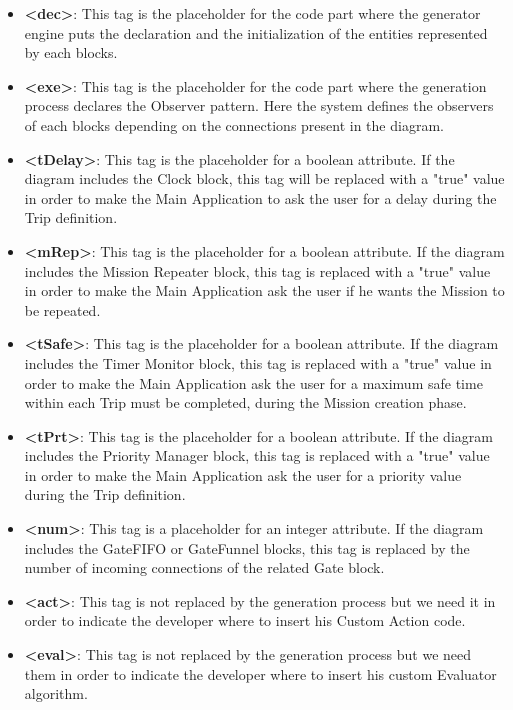 \begin{itemize}
\item{\textbf{<dec>}: This tag is the placeholder for the code part where the generator engine puts the declaration and the initialization of the entities represented by each blocks.
}
\item{\textbf{<exe>}: This tag is the placeholder for the code part where the generation process declares the Observer pattern. Here the system defines the observers of each blocks depending on the connections present in the diagram. 
}
\item{\textbf{<tDelay>}: This tag is the placeholder for a boolean attribute. If the diagram includes the Clock block, this tag will be replaced with a "true" value in order to make the Main Application to ask the user for a delay during the Trip definition.
}
\item{\textbf{<mRep>}: This tag is the placeholder for a boolean attribute. If the diagram includes the Mission Repeater block, this tag is replaced with a "true" value in order to make the Main Application ask the user if he wants the Mission to be repeated.
}
\item{\textbf{<tSafe>}: This tag is the placeholder for a boolean attribute. If the diagram includes the Timer Monitor block, this tag is replaced with a "true" value in order to make the Main Application ask the user for a maximum safe time within each Trip must be completed, during the Mission creation phase.
}
\item{\textbf{<tPrt>}: This tag is the placeholder for a boolean attribute. If the diagram includes the Priority Manager block, this tag is replaced with a "true" value in order to make the Main Application ask the user for a priority value during the Trip definition.
}
\item{\textbf{<num>}: This tag is a placeholder for an integer attribute. If the diagram includes the GateFIFO or GateFunnel blocks, this tag is replaced by the number of incoming connections of the related Gate block.
}
\item{\textbf{<act>}: This tag is not replaced by the generation process but we need it in order to indicate the developer where to insert his Custom Action code.
}
\item{\textbf{<eval>}: This tag is not replaced by the generation process but we need them in order to indicate the developer where to insert his custom Evaluator algorithm. 
}
\end{itemize}

